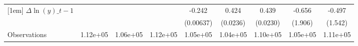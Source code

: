 {\begin{tabular}{l*{8}{c}}
[1em]
$\Delta \ln(y)\_{t-1}$&                  &                  &                  &   -0.242\sym{***}&    0.424\sym{***}&    0.439\sym{***}&   -0.656         &   -0.497         \\
          &                  &                  &                  &(0.00637)         & (0.0236)         & (0.0230)         &  (1.906)         &  (1.542)         \\
\hline
Observations& 1.12e+05         & 1.06e+05         & 1.12e+05         & 1.05e+05         & 1.04e+05         & 1.10e+05         & 1.05e+05         & 1.11e+05         \\
\hline\hline
\end{tabular}
}
